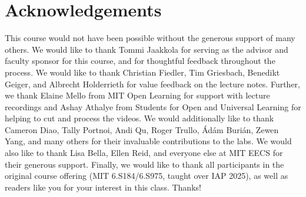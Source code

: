 \section{Acknowledgements}
This course would not have been possible without the generous support of many others. We would like to thank Tommi Jaakkola for serving as the advisor and faculty sponsor for this course, and for thoughtful feedback throughout the process. We would like to thank Christian Fiedler, Tim Griesbach, Benedikt Geiger, and Albrecht Holderrieth for value feedback on the lecture notes. Further, we thank Elaine Mello from MIT Open Learning for support with lecture recordings and Ashay Athalye from Students for Open and Universal Learning for helping to cut and process the videos. We would additionally like to thank Cameron Diao, Tally Portnoi, Andi Qu, Roger Trullo, Ádám Burián, Zewen Yang, and many others for their invaluable contributions to the labs. We would also like to thank Lisa Bella, Ellen Reid, and everyone else at MIT EECS for their generous support. Finally, we would like to thank all participants in the original course offering (MIT 6.S184/6.S975, taught over IAP 2025), as well as readers like you for your interest in this class. Thanks!